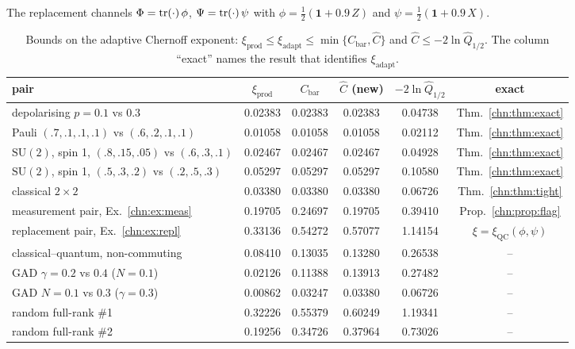 \begin{example}\label{chn:ex:repl}
The replacement channels $\Phi=\operatorname{tr}(\cdot)\,\phi$, $\Psi=\operatorname{tr}(\cdot)\,\psi$ with $\phi=\frac12(\mathbf 1+0.9\,Z)$ and $\psi=\frac12(\mathbf 1+0.9\,X)$.
\end{example}

\begin{table}[!tbp]
\centering
\small
\setlength{\tabcolsep}{4pt}
\begin{tabular}{lccccc}
\toprule
pair & $\xi_{\mathrm{prod}}$ & $C_{\mathrm{bar}}$ & $\widehat C$ (new) & $-2\ln\widehat Q_{1/2}$ & exact\\
\midrule
depolarising $p=0.1$ vs $0.3$ & 0.02383 & 0.02383 & 0.02383 & 0.04738 & Thm.~\ref{chn:thm:exact}\\
Pauli $(.7,.1,.1,.1)$ vs $(.6,.2,.1,.1)$ & 0.01058 & 0.01058 & 0.01058 & 0.02112 & Thm.~\ref{chn:thm:exact}\\
$\mathrm{SU}(2)$, spin 1, $(.8,.15,.05)$ vs $(.6,.3,.1)$ & 0.02467 & 0.02467 & 0.02467 & 0.04928 & Thm.~\ref{chn:thm:exact}\\
$\mathrm{SU}(2)$, spin 1, $(.5,.3,.2)$ vs $(.2,.5,.3)$ & 0.05297 & 0.05297 & 0.05297 & 0.10580 & Thm.~\ref{chn:thm:exact}\\
classical $2\times2$ & 0.03380 & 0.03380 & 0.03380 & 0.06726 & Thm.~\ref{chn:thm:tight}\\
measurement pair, Ex.~\ref{chn:ex:meas} & 0.19705 & 0.24697 & 0.19705 & 0.39410 & Prop.~\ref{chn:prop:flag}\\
replacement pair, Ex.~\ref{chn:ex:repl} & 0.33136 & 0.54272 & 0.57077 & 1.14154 & $\xi=\xi_{\mathrm{QC}}(\phi,\psi)$\\
classical--quantum, non-commuting & 0.08410 & 0.13035 & 0.13280 & 0.26538 & --\\
GAD $\gamma=0.2$ vs $0.4$ ($N=0.1$) & 0.02126 & 0.11388 & 0.13913 & 0.27482 & --\\
GAD $N=0.1$ vs $0.3$ ($\gamma=0.3$) & 0.00862 & 0.03247 & 0.03380 & 0.06726 & --\\
random full-rank \#1 & 0.32226 & 0.55379 & 0.60249 & 1.19341 & --\\
random full-rank \#2 & 0.19256 & 0.34726 & 0.37964 & 0.73026 & --\\
\bottomrule
\end{tabular}
\caption{Bounds on the adaptive Chernoff exponent: $\xi_{\mathrm{prod}}\le\xi_{\mathrm{adapt}}\le\min\{C_{\mathrm{bar}},\widehat C\}$ and $\widehat C\le-2\ln\widehat Q_{1/2}$. The column ``exact'' names the result that identifies $\xi_{\mathrm{adapt}}$.}
\label{chn:tab:num}
\end{table}

